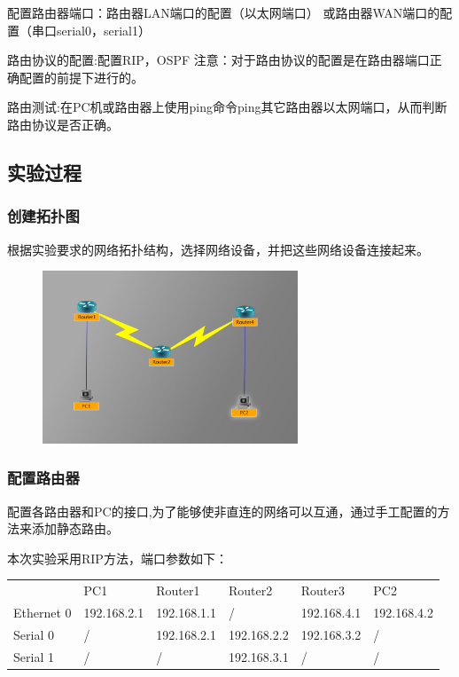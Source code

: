\documentclass{article}
\begin{document}
配置路由器端口：路由器LAN端口的配置（以太网端口）
或路由器WAN端口的配置（串口serial0，serial1）
\par

路由协议的配置:配置RIP，OSPF
注意：对于路由协议的配置是在路由器端口正确配置的前提下进行的。
\par

路由测试:在PC机或路由器上使用ping命令ping其它路由器以太网端口，从而判断路由协议是否正确。

\subsection{实验过程}
\subsubsection{创建拓扑图}
根据实验要求的网络拓扑结构，选择网络设备，并把这些网络设备连接起来。

\begin{figure}[H]
    \centering
    \includegraphics[width=3in]{pic.PNG}
\end{figure} 

\subsubsection{配置路由器}
配置各路由器和PC的接口,为了能够使非直连的网络可以互通，通过手工配置的方法来添加静态路由。\par
本次实验采用RIP方法，端口参数如下：
\begin{table}[]
\begin{tabular}{llllll}
           & PC1         & Router1     & Router2     & Router3     & PC2         \\
Ethernet 0 & 192.168.2.1 & 192.168.1.1 & /           & 192.168.4.1 & 192.168.4.2 \\
Serial 0   & /           & 192.168.2.1 & 192.168.2.2 & 192.168.3.2 & /           \\
Serial 1   & /           & /           & 192.168.3.1 & /           & /          
\end{tabular}
\end{table}
\end{document}
